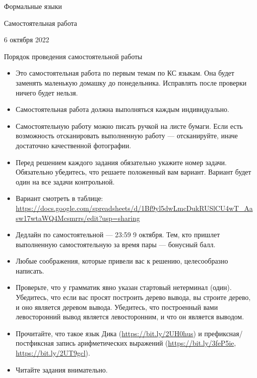 \documentclass[12pt]{article}
\begin{document}
\begin{center}
{\LARGE Формальные языки}

{\Large Самостоятельная работа}

{\large 6 октября 2022}
\end{center}

\bigskip

\begin{center}
  \LARGE Порядок проведения самостоятельной работы
\end{center}

\begin{itemize}
  \item Это самостоятельная работа по первым темам по КС языкам. Она будет заменять маленькую домашку до понедельника. Исправлять после проверки ничего будет нельзя.
  \item Самостоятельная работа должна выполняться каждым индивидуально.
  \item Самостоятельную работу можно писать ручкой на листе бумаги. Если есть возможность отсканировать выполненную работу --- отсканируйте, иначе достаточно качественной фотографии.
  \item Перед решением каждого задания обязательно укажите номер задачи. Обязательно убедитесь, что решаете положенный вам вариант. Вариант будет один на все задачи контрольной.
  \item Вариант смотреть в таблице: \url{https://docs.google.com/spreadsheets/d/1Bf9yl5dwLmcDukRUSlCU4wT_Aasw17wtaWQ4Mcsmrrs/edit?usp=sharing}
  \item Дедлайн по самостоятельной --- 23:59 9 октября. Тем, кто пришлет выполненную самостоятельную за время пары --- бонусный балл.
  \item Любые соображения, которые привели вас к решению, целесообразно написать.
  \item Проверьте, что у грамматик явно указан стартовый нетерминал (один). Убедитесь, что если вас просят построить дерево вывода, вы строите дерево, и оно является деревом вывода. Убедитесь, что построенный вами левосторонний вывод является левосторонним, и что он является выводом.
  \item Прочитайте, что такое язык Дика (\url{https://bit.ly/2UH0hus}) и префиксная/постфиксная запись арифметических выражений (\url{https://bit.ly/3feP5ie}, \url{https://bit.ly/2UT9gcl}).
  \item Читайте задания внимательно.
\end{itemize}

\newpage
\end{document}
